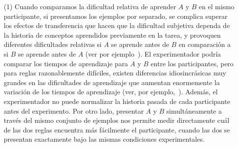 \begin{enumerate}
\item [(1)] 
Cuando comparamos la dificultad relativa de aprender $A$ y $B$ en el mismo participante, si presentamos los ejemplos por separado, se complica superar los efectos de transferencia que hacen que la dificultad subjetiva dependa de la historia de conceptos aprendidos previamente en la tarea, y provoquen diferentes dificultades relativas si $A$ se aprende antes de $B$ en comparación a si $B$ se aprende antes de $A$ (ver por ejemplo~\cite{tano2020towards}). El experimentador podría comparar los tiempos de aprendizaje para $A$ y $B$ entre los participantes, pero para reglas razonablemente difíciles, existen diferencias idiosincrásicas muy grandes en las dificultades de aprendizaje que aumentan enormemente la variación de los tiempos de aprendizaje (ver, por ejemplo,~\cite{feldman2000minimization}). Además, el experimentador no puede normalizar la historia pasada de cada participante antes del experimento. Por otro lado, presentar $A$ y $B$ simultáneamente a través del mismo conjunto de ejemplos nos permite medir directamente cuál de las dos reglas encuentra más fácilmente el participante, cuando las dos se presentan exactamente bajo las mismas condiciones experimentales.


\end{enumerate}
